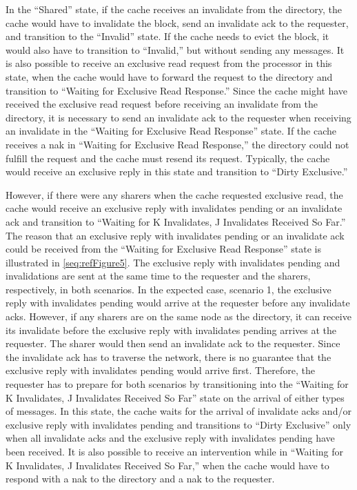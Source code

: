 \documentclass[letterpaper]{article}
\newcounter{Figure}
\begin{document}
In the ``Shared'' state, if the cache receives an invalidate from the directory, the cache would have to invalidate the block, send an invalidate ack to the requester, and transition to the ``Invalid'' state. If the cache needs to evict the block, it would also have to transition to ``Invalid,'' but without sending any messages. It is also possible to receive an exclusive read request from the processor in this state, when the cache would have to forward the request to the directory and transition to ``Waiting for Exclusive Read Response.'' Since the cache might have received the exclusive read request before receiving an invalidate from the directory, it is necessary to send an invalidate ack to the requester when receiving an invalidate in the ``Waiting for Exclusive Read Response'' state. If the cache receives a nak in ``Waiting for Exclusive Read Response,'' the directory could not fulfill the request and the cache must resend its request. Typically, the cache would receive an exclusive reply in this state and transition to ``Dirty Exclusive.''

However, if there were any sharers when the cache requested exclusive read, the cache would receive an exclusive reply with invalidates pending or an invalidate ack and transition to ``Waiting for K Invalidates, J Invalidates Received So Far.'' The reason that an exclusive reply with invalidates pending or an invalidate ack could be received from the ``Waiting for Exclusive Read Response'' state is illustrated in \ref{seq:refFigure5}. The exclusive reply with invalidates pending and invalidations are sent at the same time to the requester and the sharers, respectively, in both scenarios. In the expected case, scenario 1, the exclusive reply with invalidates pending would arrive at the requester before any invalidate acks. However, if any sharers are on the same node as the directory, it can receive its invalidate before the exclusive reply with invalidates pending arrives at the requester. The sharer would then send an invalidate ack to the requester. Since the invalidate ack has to traverse the network, there is no guarantee that the exclusive reply with invalidates pending would arrive first. Therefore, the requester has to prepare for both scenarios by transitioning into the ``Waiting for K Invalidates, J Invalidates Received So Far'' state on the arrival of either types of messages. In this state, the cache waits for the arrival of invalidate acks and/or exclusive reply with invalidates pending and transitions to ``Dirty Exclusive'' only when all invalidate acks and the exclusive reply with invalidates pending have been received. It is also possible to receive an intervention while in ``Waiting for K Invalidates, J Invalidates Received So Far,'' when the cache would have to respond with a nak to the directory and a nak to the requester.
\end{document}
